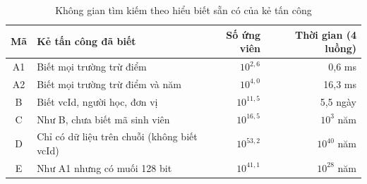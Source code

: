 \begin{table}[H]
\centering
\caption{Không gian tìm kiếm theo hiểu biết sẵn có của kẻ tấn công}
\label{tab:v2-oracle}
\renewcommand{\arraystretch}{1.2}
\small
\begin{tabular}{|c|p{6.4cm}|r|r|}
\hline
\textbf{Mã} & \textbf{Kẻ tấn công đã biết} & \textbf{Số ứng viên} & \textbf{Thời gian (4 luồng)} \\ \hline
A1 & Biết mọi trường trừ điểm & $10^{2{,}6}$ & 0{,}6 ms \\ \hline
A2 & Biết mọi trường trừ điểm và năm & $10^{4{,}0}$ & 16{,}3 ms \\ \hline
B & Biết vcId, người học, đơn vị & $10^{11{,}5}$ & 5{,}5 ngày \\ \hline
C & Như B, chưa biết mã sinh viên & $10^{16{,}5}$ & $10^{3}$ năm \\ \hline
D & Chỉ có dữ liệu trên chuỗi (không biết vcId) & $10^{53{,}2}$ & $10^{40}$ năm \\ \hline
E & Như A1 nhưng có muối 128 bit & $10^{41{,}1}$ & $10^{28}$ năm \\ \hline
\end{tabular}
\end{table}
